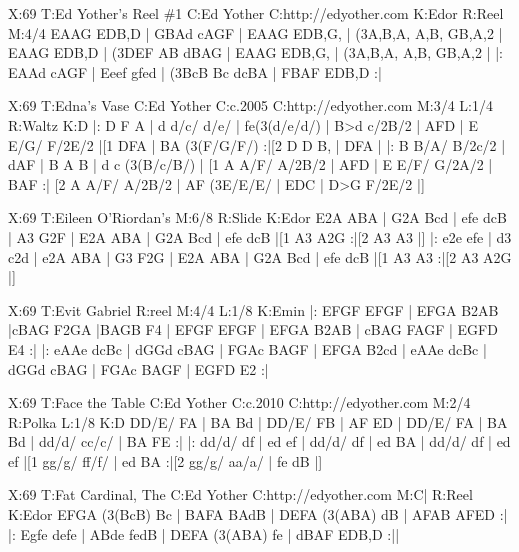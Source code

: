 \documentclass[letterpaper]{article}
\begin{document}
\begin{abc}[name]
X:69
T:Ed Yother's Reel \#1
C:Ed Yother
C:http://edyother.com
K:Edor
R:Reel
M:4/4
EAAG EDB,D | GBAd cAGF | EAAG EDB,G, | (3A,B,A, A,B, GB,A,2 |
EAAG EDB,D | (3DEF AB dBAG | EAAG EDB,G, | (3A,B,A, A,B, GB,A,2 |
|:  EAAd cAGF | Eeef gfed | (3BcB Bc dcBA | FBAF EDB,D :|

\end{abc}

\begin{abc}[name]
X:69
T:Edna's Vase
C:Ed Yother
C:c.2005
C:http://edyother.com
M:3/4
L:1/4
R:Waltz
K:D
|:  D F A | d d/c/ d/e/ | fe(3(d/e/d/) |  B>d c/2B/2 |
 AFD | E E/G/ F/2E/2 |[1  DFA | BA (3(F/G/F/) :|[2  D D B, |  DFA |
|:  B B/A/ B/2c/2 | dAF | B A B | d c (3(B/c/B/) |
[1 A A/F/ A/2B/2 | AFD | E E/F/ G/2A/2 | BAF :|
[2 A A/F/ A/2B/2 | AF (3E/E/E/ |  EDC |  D>G F/2E/2 |]
\end{abc}

\begin{abc}[name]
X:69
T:Eileen O'Riordan's
M:6/8
R:Slide
K:Edor
E2A ABA | G2A Bcd | efe dcB | A3 G2F |
E2A ABA | G2A Bcd | efe dcB |[1 A3 A2G :|[2 A3 A3 |]
|: e2e efe | d3 c2d | e2A ABA | G3 F2G |
E2A ABA | G2A Bcd | efe dcB |[1 A3 A3 :|[2 A3 A2G |]
\end{abc}

\begin{abc}[name]
X:69
T:Evit Gabriel
R:reel
M:4/4
L:1/8
K:Emin
|: EFGF EFGF | EFGA B2AB |cBAG F2GA |BAGB F4 |
EFGF EFGF | EFGA B2AB | cBAG FAGF | EGFD E4 :|
|: eAAe dcBc | dGGd cBAG | FGAc BAGF | EFGA B2cd |
eAAe dcBc | dGGd cBAG | FGAc BAGF | EGFD E2 :|
\end{abc}

\begin{abc}[name]
X:69
T:Face the Table
C:Ed Yother
C:c.2010
C:http://edyother.com
M:2/4
R:Polka
L:1/8
K:D
DD/E/ FA | BA Bd | DD/E/ FB | AF ED |
DD/E/ FA | BA Bd | dd/d/ cc/c/ | BA FE :|
|: dd/d/ df | ed ef | dd/d/ df | ed BA |
dd/d/ df | ed ef |[1 gg/g/ ff/f/ | ed BA :|[2 gg/g/ aa/a/ | fe dB |]
\end{abc}

\begin{abc}[name]
X:69
T:Fat Cardinal, The
C:Ed Yother
C:http://edyother.com
M:C|
R:Reel
K:Edor
EFGA (3(BcB) Bc | BAFA BAdB | DEFA (3(ABA) dB | AFAB AFED :|
|: Egfe defe | ABde fedB | DEFA (3(ABA) fe | dBAF EDB,D :||
\end{abc}
\end{document}
